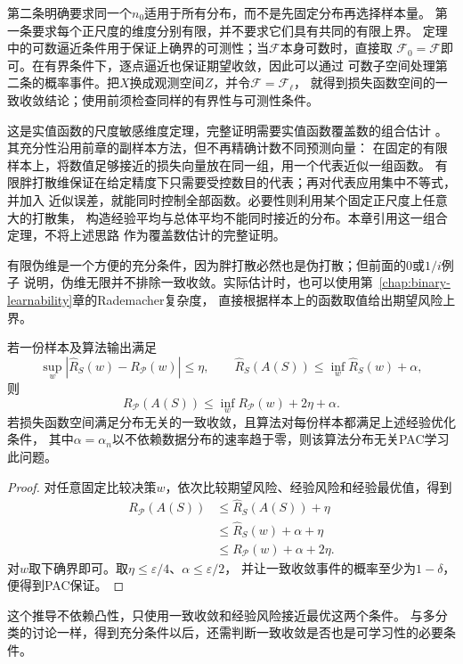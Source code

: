 第二条明确要求同一个$n_0$适用于所有分布，而不是先固定分布再选择样本量。
第一条要求每个正尺度的维度分别有限，并不要求它们具有共同的有限上界。
定理中的可数逼近条件用于保证上确界的可测性；当$\mathcal F$本身可数时，直接取
$\mathcal F_0=\mathcal F$即可。在有界条件下，逐点逼近也保证期望收敛，因此可以通过
可数子空间处理第二条的概率事件。把$X$换成观测空间$Z$，并令$\mathcal F=\mathcal F_\ell$，
就得到损失函数空间的一致收敛结论；使用前须检查同样的有界性与可测性条件。

这是实值函数的尺度敏感维度定理，完整证明需要实值函数覆盖数的组合估计
。其充分性沿用前章的副样本方法，但不再精确计数不同预测向量：
在固定的有限样本上，将数值足够接近的损失向量放在同一组，用一个代表近似一组函数。
有限胖打散维保证在给定精度下只需要受控数目的代表；再对代表应用集中不等式，并加入
近似误差，就能同时控制全部函数。必要性则利用某个固定正尺度上任意大的打散集，
构造经验平均与总体平均不能同时接近的分布。本章引用这一组合定理，不将上述思路
作为覆盖数估计的完整证明。

有限伪维是一个方便的充分条件，因为胖打散必然也是伪打散；但前面的$0$或$1/i$例子
说明，伪维无限并不排除一致收敛。实际估计时，也可以使用第~\ref{chap:binary-learnability}章的Rademacher复杂度，
直接根据样本上的函数取值给出期望风险上界。

\begin{theorem}[一致收敛推出一般学习保证]
\label{thm:general-uniform-pac}
若一份样本及算法输出满足
\[
 \sup_w|\hat R_S(w)-R_{\mathcal P}(w)|\leq\eta,\qquad
 \hat R_S(A(S))\leq\inf_w\hat R_S(w)+\alpha,
\]
则
\[
 R_{\mathcal P}(A(S))\leq\inf_w R_{\mathcal P}(w)+2\eta+\alpha.
\]
若损失函数空间满足分布无关的一致收敛，且算法对每份样本都满足上述经验优化条件，
其中$\alpha=\alpha_n$以不依赖数据分布的速率趋于零，则该算法分布无关PAC学习此问题。
\end{theorem}
\begin{proof}
对任意固定比较决策$w$，依次比较期望风险、经验风险和经验最优值，得到
\begin{align*}
 R_{\mathcal P}(A(S))&\leq\hat R_S(A(S))+\eta\\
 &\leq\hat R_S(w)+\alpha+\eta\\
 &\leq R_{\mathcal P}(w)+\alpha+2\eta.
\end{align*}
对$w$取下确界即可。取$\eta\leq\varepsilon/4$、$\alpha\leq\varepsilon/2$，
并让一致收敛事件的概率至少为$1-\delta$，便得到PAC保证。
\end{proof}

这个推导不依赖凸性，只使用一致收敛和经验风险接近最优这两个条件。
与多分类的讨论一样，得到充分条件以后，还需判断一致收敛是否也是可学习性的必要条件。

